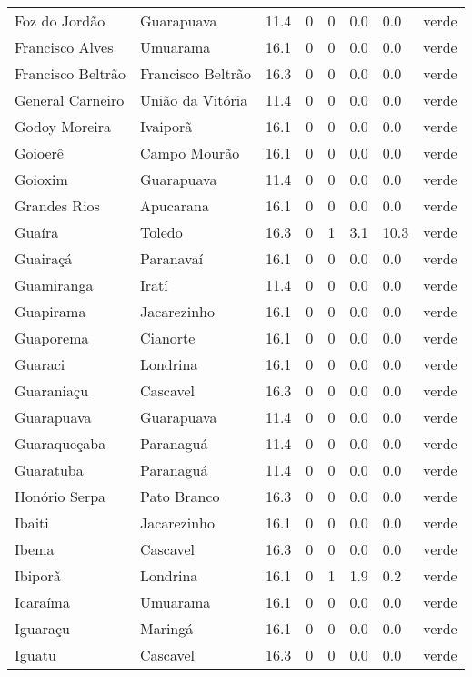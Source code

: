 \begin{longtable}{l|lllllll}
  Foz do Jordão & Guarapuava & 11.4 & 0 & 0 & 0.0 & 0.0 & verde \\ 
  Francisco Alves & Umuarama & 16.1 & 0 & 0 & 0.0 & 0.0 & verde \\ 
  Francisco Beltrão & Francisco Beltrão & 16.3 & 0 & 0 & 0.0 & 0.0 & verde \\ 
  General Carneiro & União da Vitória & 11.4 & 0 & 0 & 0.0 & 0.0 & verde \\ 
  Godoy Moreira & Ivaiporã & 16.1 & 0 & 0 & 0.0 & 0.0 & verde \\ 
  Goioerê & Campo Mourão & 16.1 & 0 & 0 & 0.0 & 0.0 & verde \\ 
  Goioxim & Guarapuava & 11.4 & 0 & 0 & 0.0 & 0.0 & verde \\ 
  Grandes Rios & Apucarana & 16.1 & 0 & 0 & 0.0 & 0.0 & verde \\ 
  Guaíra & Toledo & 16.3 & 0 & 1 & 3.1 & 10.3 & verde \\ 
  Guairaçá & Paranavaí & 16.1 & 0 & 0 & 0.0 & 0.0 & verde \\ 
  Guamiranga & Iratí & 11.4 & 0 & 0 & 0.0 & 0.0 & verde \\ 
  Guapirama & Jacarezinho & 16.1 & 0 & 0 & 0.0 & 0.0 & verde \\ 
  Guaporema & Cianorte & 16.1 & 0 & 0 & 0.0 & 0.0 & verde \\ 
  Guaraci & Londrina & 16.1 & 0 & 0 & 0.0 & 0.0 & verde \\ 
  Guaraniaçu & Cascavel & 16.3 & 0 & 0 & 0.0 & 0.0 & verde \\ 
  Guarapuava & Guarapuava & 11.4 & 0 & 0 & 0.0 & 0.0 & verde \\ 
  Guaraqueçaba & Paranaguá & 11.4 & 0 & 0 & 0.0 & 0.0 & verde \\ 
  Guaratuba & Paranaguá & 11.4 & 0 & 0 & 0.0 & 0.0 & verde \\ 
  Honório Serpa & Pato Branco & 16.3 & 0 & 0 & 0.0 & 0.0 & verde \\ 
  Ibaiti & Jacarezinho & 16.1 & 0 & 0 & 0.0 & 0.0 & verde \\ 
  Ibema & Cascavel & 16.3 & 0 & 0 & 0.0 & 0.0 & verde \\ 
  Ibiporã & Londrina & 16.1 & 0 & 1 & 1.9 & 0.2 & verde \\ 
  Icaraíma & Umuarama & 16.1 & 0 & 0 & 0.0 & 0.0 & verde \\ 
  Iguaraçu & Maringá & 16.1 & 0 & 0 & 0.0 & 0.0 & verde \\ 
  Iguatu & Cascavel & 16.3 & 0 & 0 & 0.0 & 0.0 & verde \\ 

\end{longtable}
